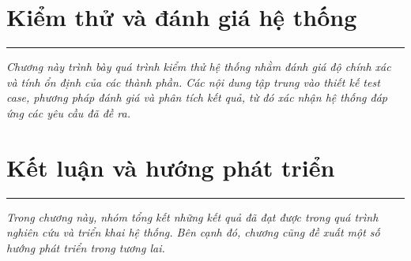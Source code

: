 \documentclass[a4paper]{article}
\theoremstyle{definition}
\begin{document}
\section{Kiểm thử và đánh giá hệ thống}
\hrule
\begin{center}
  \begin{minipage}{0.75\textwidth}
    \begin{center}
      \itshape
      Chương này trình bày quá trình kiểm thử hệ thống nhằm đánh giá độ chính xác và tính ổn định của các thành phần. Các nội dung tập trung vào thiết kế test case, phương pháp đánh giá và phân tích kết quả, từ đó xác nhận hệ thống đáp ứng các yêu cầu đã đề ra.
    \end{center}
  \end{minipage}
\end{center}






\clearpage





\section{Kết luận và hướng phát triển}
\hrule
\begin{center}
  \begin{minipage}{0.75\textwidth}
    \begin{center}
      \itshape
      Trong chương này, nhóm tổng kết những kết quả đã đạt được trong quá trình nghiên cứu và triển khai hệ thống. Bên cạnh đó, chương cũng đề xuất một số hướng phát triển trong tương lai.
    \end{center}
  \end{minipage}
\end{center}


\clearpage










{}
\renewcommand{\refname}{Tài liệu tham khảo}


\clearpage

\clearpage
\end{document}
